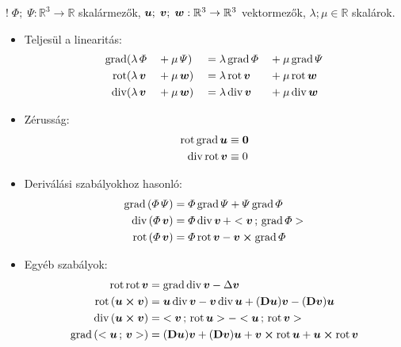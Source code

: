 \documentclass[main.tex]{subfiles}
\begin{document}
$! \; \varPhi; \; \varPsi : \mathbb{R}^3
  \rightarrow \mathbb{R}$ skalármezők,
$\bm{u}; \; \bm{v}; \; \bm{w} : \mathbb{R}^3
  \rightarrow \mathbb{R}^3$ vektormezők,
$\lambda; \mu \in \mathbb{R}$ skalárok.
\begin{itemize}
  \item Teljesül a linearitás:
        \begin{alignat*}{4}
          \mathrm{grad} & (\lambda \, \varPhi  &  & + \mu \, \varPsi)  &  & = \lambda \, \mathrm{grad} \, \varPhi &  & + \mu \, \mathrm{grad} \, \varPsi
          \\
          \mathrm{rot}  & (\lambda \, \bm{v} &  & + \mu \, \bm{w}) &  & = \lambda \, \mathrm{rot} \, \bm{v} &  & + \mu \, \mathrm{rot} \, \bm{w}
          \\
          \mathrm{div}  & (\lambda \, \bm{v} &  & + \mu \, \bm{w}) &  & = \lambda \, \mathrm{div} \, \bm{v} &  & + \mu \, \mathrm{div} \, \bm{w}
        \end{alignat*}

  \item Zérusság:
        \begin{alignat*}{1}
          \mathrm{rot} \, \mathrm{grad} \, \bm{u} & \equiv \bm{0}
          \\
          \mathrm{div} \, \mathrm{rot} \, \bm{v}  & \equiv 0
        \end{alignat*}

  \item Deriválási szabályokhoz hasonló:
        \begin{align*}
          \mathrm{grad} \left( \varPhi \, \varPsi \right)
           & = \varPhi \, \mathrm{grad} \, \varPsi
          + \varPsi \, \mathrm{grad} \, \varPhi
          \\
          \mathrm{div} \left( \varPhi \, \bm{v} \right)
           & = \varPhi \, \mathrm{div} \, \bm{v} \,
          + < \bm{v} \, ; \, \mathrm{grad} \, \varPhi >
          \\
          \mathrm{rot} \left( \varPhi \, \bm{v} \right)
           & = \varPhi \, \mathrm{rot} \, \bm{v}
          - \bm{v} \cross \mathrm{grad} \, \varPhi
        \end{align*}

  \item Egyéb szabályok:
        \begin{align*}
          \mathrm{rot} \, \mathrm{rot} \, \bm{v}
           & =\mathrm{grad} \, \mathrm{div} \, \bm{v}
          - \Delta \bm{v}
          \\
          \mathrm{rot} \left( \bm{u} \cross \bm{v} \right)
           & = \bm{u} \, \mathrm{div} \, \bm{v}
          - \bm{v} \, \mathrm{div} \, \bm{u}
          + (\mathbf{D} \bm{u}) \bm{v}
          - (\mathbf{D} \bm{v}) \bm{u}
          \\
          \mathrm{div} \left( \bm{u} \cross \bm{v} \right)
           & = \; < \bm{v} \, ; \, \mathrm{rot} \, \bm{u} >
          - < \bm{u} \, ; \, \mathrm{rot} \, \bm{v} >
          \\
          \mathrm{grad} \left( < \bm{u} \, ; \, \bm{v} > \right)
           & = (\mathbf{D} \bm{u}) \bm{v}
          + (\mathbf{D} \bm{v}) \bm{u}
          + \bm{v} \cross \mathrm{rot} \, \bm{u}
          + \bm{u} \cross \mathrm{rot} \, \bm{v}
        \end{align*}
\end{itemize}
\end{document}
